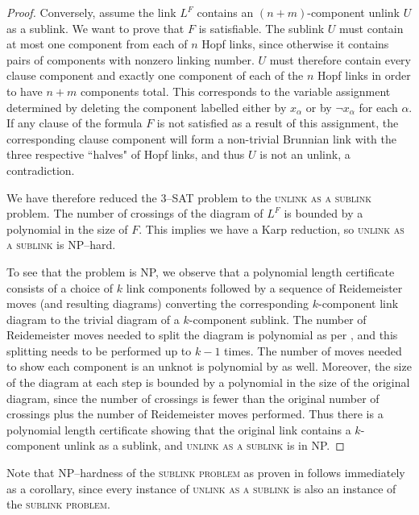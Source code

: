 \documentclass[12pt]{amsart}
\theoremstyle{definition}
\theoremstyle{remark}
\begin{document}
\begin{proof}
Conversely, assume the link $L^F$ contains an $(n+m)$-component unlink $U$ as a sublink. We want to prove that $F$ is satisfiable. The sublink $U$ must contain at most one component from each of $n$ Hopf links, since otherwise it contains pairs of components with nonzero linking number.  $U$ must therefore contain every clause component and exactly one component of each of the $n$ Hopf links in order to have $n+m$ components total. This corresponds to the variable assignment determined by deleting the component labelled either by $x_\alpha$ or  by $\neg x_\alpha$ for each $\alpha$.  If any clause of the formula $F$ is not satisfied as a result of this assignment, the corresponding clause component will form a non-trivial Brunnian link with the three respective ``halves" of Hopf links, and thus $U$ is not an unlink, a contradiction.


We have therefore reduced the 3--\textsc{SAT} problem to the \textsc{unlink as a sublink} problem. The number of crossings of the diagram of $L^F$ is bounded by a polynomial in the size of $F$.  This implies we have a Karp reduction, so \textsc{unlink as a sublink} is NP--hard.

To see that the problem is NP, we observe that a polynomial length certificate consists of a choice of $k$ link components followed by a sequence of Reidemeister moves (and resulting diagrams) converting the corresponding $k$-component link diagram to the trivial diagram of a $k$-component sublink.  The number of Reidemeister moves needed to split the diagram is polynomial as per \cite{HassLagariasPippenger1, Lackenby2}, and this splitting needs to be performed up to $k-1$ times. The number of moves needed to show each component is an unknot is polynomial by \cite{HassLagariasPippenger1, Lackenby2} as well.  Moreover, the size of the diagram at each step is bounded by a polynomial in the size of the original diagram, since the number of crossings is fewer than the original number of crossings plus the number of Reidemeister moves performed.  Thus there is a polynomial length certificate showing that the original link contains a $k$-component unlink as a sublink, and \textsc{unlink as a sublink} is in NP. \end{proof}
Note that NP--hardness of the \textsc{sublink problem} as proven in \cite{Lackenby1} follows immediately as a corollary, since every instance of \textsc{unlink as a sublink} is also an instance of the \textsc{sublink problem}.

\vspace*{1.5cm}
\end{document}
